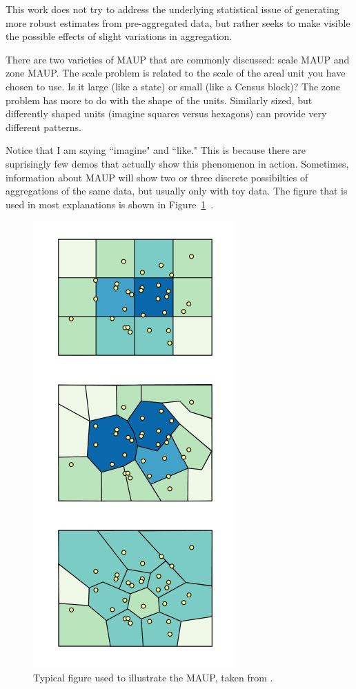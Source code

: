 \documentclass{article}\usepackage[]{graphicx}\usepackage[]{color}
\begin{document}
This work does not try to address the underlying statistical issue of generating more robust estimates from pre-aggregated data, but rather seeks to make visible the possible effects of slight variations in aggregation. 

There are two varieties of MAUP that are commonly discussed: scale MAUP and zone MAUP. The scale problem is related to the scale of the areal unit you have chosen to use. Is it large (like a state) or small (like a Census block)? The zone problem has more to do with the shape of the units. Similarly sized, but differently shaped units (imagine squares versus hexagons) can provide very different patterns. 

Notice that I am saying ``imagine" and ``like." This is because there are suprisingly few demos that actually show this phenomenon in action. Sometimes, information about MAUP will show two or three discrete possibilties of aggregations of the same data, but usually only with toy data. The figure that is used in most explanations is shown in Figure~\ref{MAUP}~\citep{Pen2014, Erv2015}. 

\begin{figure}[htbp]
\begin{centering}
\includegraphics[height=0.5\textheight]{../img/MAUPZone1}
\caption{Typical figure used to illustrate the MAUP, taken from \cite{Erv2015}.}\label{MAUP}
\end{centering}
\end{figure}
\end{document}
